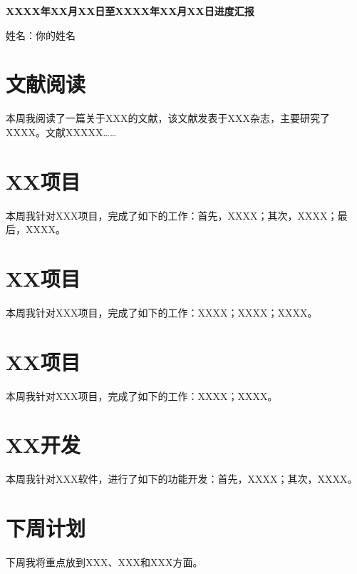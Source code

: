 \documentclass{CQMUReport}  %
\begin{document}
\begin{center}
    {\Large\bfseries XXXX年XX月XX日至XXXX年XX月XX日进度汇报\par}
\end{center}
\vspace{-0.3em}
\hfill 姓名：你的姓名\,\par
\vspace{-0.3em}

\section{文献阅读}
本周我阅读了一篇关于XXX的文献，该文献发表于XXX杂志，主要研究了XXXX。文献XXXXX……

\section{XX项目}
本周我针对XXX项目，完成了如下的工作：首先，XXXX；其次，XXXX；最后，XXXX。

\section{XX项目}
本周我针对XXX项目，完成了如下的工作：XXXX；XXXX；XXXX。

\section{XX项目}
本周我针对XXX项目，完成了如下的工作：XXXX；XXXX。

\section{XX开发}
本周我针对XXX软件，进行了如下的功能开发：首先，XXXX；其次，XXXX。

\section{下周计划}
下周我将重点放到XXX、XXX和XXX方面。
\end{document}
